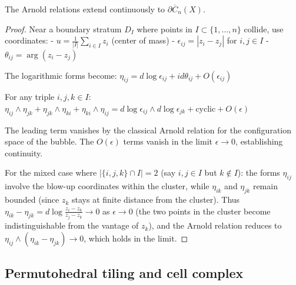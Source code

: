 \begin{lemma}\label{lem:arnold-boundary}
The Arnold relations extend continuously to $\partial \overline{C}_n(X)$.
\end{lemma}

\begin{proof}
Near a boundary stratum $D_I$ where points in $I \subset \{1,\ldots,n\}$ collide, use coordinates:
- $u = \frac{1}{|I|}\sum_{i \in I} z_i$ (center of mass)
- $\epsilon_{ij} = |z_i - z_j|$ for $i,j \in I$
- $\theta_{ij} = \arg(z_i - z_j)$

The logarithmic forms become:
$\eta_{ij} = d\log \epsilon_{ij} + id\theta_{ij} + O(\epsilon_{ij})$

For any triple $i,j,k \in I$:
$\eta_{ij} \wedge \eta_{jk} + \eta_{jk} \wedge \eta_{ki} + \eta_{ki} \wedge \eta_{ij} = d\log \epsilon_{ij} \wedge d\log \epsilon_{jk} + \text{cyclic} + O(\epsilon)$

The leading term vanishes by the classical Arnold relation for the configuration space of the bubble. The $O(\epsilon)$ terms vanish in the limit $\epsilon \to 0$, establishing continuity.

For the mixed case where $|\{i,j,k\} \cap I| = 2$ (say $i,j \in I$ but $k \notin I$): the forms $\eta_{ij}$ involve the blow-up coordinates within the cluster, while $\eta_{ik}$ and $\eta_{jk}$ remain bounded (since $z_k$ stays at finite distance from the cluster).  Thus $\eta_{ik} - \eta_{jk} = d\log\frac{z_i - z_k}{z_j - z_k} \to 0$ as $\epsilon \to 0$ (the two points in the cluster become indistinguishable from the vantage of $z_k$), and the Arnold relation reduces to $\eta_{ij} \wedge (\eta_{ik} - \eta_{jk}) \to 0$, which holds in the limit.
\end{proof}

\subsection{Permutohedral tiling and cell complex}
 
